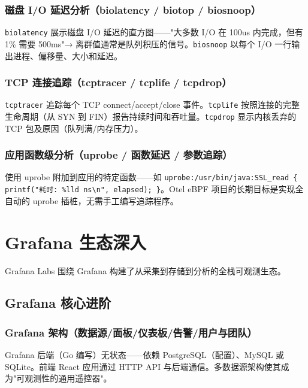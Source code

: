 \documentclass[12pt,UTF8]{ctexbook}
\begin{document}
    \subsection{磁盘 I/O 延迟分析（biolatency / biotop / biosnoop）}

\texttt{biolatency} 展示磁盘 I/O 延迟的直方图——"大多数 I/O 在 100us 内完成，但有 1\% 需要 500ms"→ 离群值通常是队列积压的信号。\texttt{biosnoop} 以每个 I/O 一行输出进程、偏移量、大小和延迟。

    \subsection{TCP 连接追踪（tcptracer / tcplife / tcpdrop）}

\texttt{tcptracer} 追踪每个 TCP connect/accept/close 事件。\texttt{tcplife} 按照连接的完整生命周期（从 SYN 到 FIN）报告持续时间和吞吐量。\texttt{tcpdrop} 显示内核丢弃的 TCP 包及原因（队列满/内存压力）。

    \subsection{应用函数级分析（uprobe / 函数延迟 / 参数追踪）}

使用 uprobe 附加到应用的特定函数——如 \texttt{uprobe:/usr/bin/java:SSL\_read \{ printf("耗时: \%lld ns\textbackslash n", elapsed); \}}。Otel eBPF 项目的长期目标是实现全自动的 uprobe 插桩，无需手工编写追踪程序。


\chapter{Grafana 生态深入}
\label{chap:grafana-ecosystem-deep}

Grafana Labs 围绕 Grafana 构建了从采集到存储到分析的全栈可观测生态。

  \section{Grafana 核心进阶}
    \subsection{Grafana 架构（数据源/面板/仪表板/告警/用户与团队）}

Grafana 后端（Go 编写）无状态——依赖 PostgreSQL（配置）、MySQL 或 SQLite。前端 React 应用通过 HTTP API 与后端通信。多数据源架构使其成为"可观测性的通用遥控器"。
\end{document}

